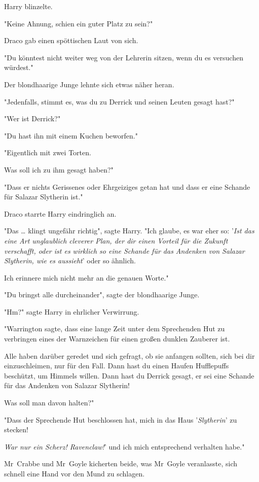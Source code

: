 {Harry blinzelte.

"Keine Ahnung, schien ein guter Platz zu sein?"

Draco gab einen spöttischen Laut von sich.

"Du könntest nicht weiter weg von der Lehrerin sitzen, wenn du es versuchen würdest."

Der blondhaarige Junge lehnte sich etwas näher heran.

"Jedenfalls, stimmt es, was du zu Derrick und seinen Leuten gesagt hast?"

"Wer ist Derrick?"

"Du hast ihn mit einem Kuchen beworfen."

"Eigentlich mit zwei Torten.

Was soll ich zu ihm gesagt haben?"

"Dass er nichts Gerissenes oder Ehrgeiziges getan hat und dass er eine Schande für Salazar Slytherin ist."

Draco starrte Harry eindringlich an.

"Das … klingt ungefähr richtig", sagte Harry. "Ich glaube, es war eher so: '\emph{Ist das eine Art unglaublich cleverer Plan, der dir einen Vorteil für die Zukunft verschafft, oder ist es wirklich so eine Schande für das Andenken von Salazar Slytherin, wie es aussieht}' oder so ähnlich.

Ich erinnere mich nicht mehr an die genauen Worte."

"Du bringst alle durcheinander", sagte der blondhaarige Junge.

"Hm?" sagte Harry in ehrlicher Verwirrung.

"Warrington sagte, dass eine lange Zeit unter dem Sprechenden Hut zu verbringen eines der Warnzeichen für einen großen dunklen Zauberer ist.

Alle haben darüber geredet und sich gefragt, ob sie anfangen sollten, sich bei dir einzuschleimen, nur für den Fall. Dann hast du einen Haufen Hufflepuffs beschützt, um Himmels willen. Dann hast du Derrick gesagt, er sei eine Schande für das Andenken von Salazar Slytherin!

Was soll man davon halten?"

"Dass der Sprechende Hut beschlossen hat, mich in das Haus '\emph{Slytherin}' zu stecken!

\emph{War nur ein Scherz! Ravenclaw!}' und ich mich entsprechend verhalten habe."

Mr~Crabbe und Mr~Goyle kicherten beide, was Mr~Goyle veranlasste, sich schnell eine Hand vor den Mund zu schlagen.

}
